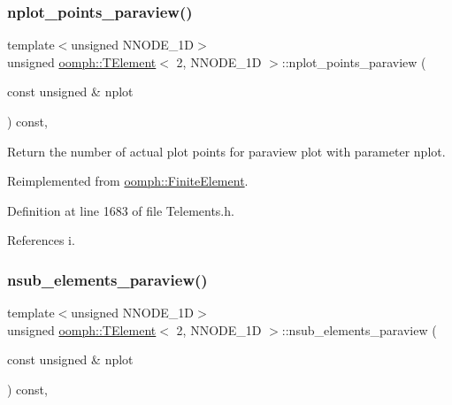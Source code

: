 \subsubsection{\texorpdfstring{nplot\+\_\+points\+\_\+paraview()}{nplot\_points\_paraview()}}
{\footnotesize\ttfamily template$<$unsigned N\+N\+O\+D\+E\+\_\+1D$>$ \\
unsigned \hyperlink{classoomph_1_1TElement}{oomph\+::\+T\+Element}$<$ 2, N\+N\+O\+D\+E\+\_\+1D $>$\+::nplot\+\_\+points\+\_\+paraview (\begin{DoxyParamCaption}\item[{const unsigned \&}]{nplot }\end{DoxyParamCaption}) const\hspace{0.3cm}{\ttfamily [inline]}, {\ttfamily [virtual]}}



Return the number of actual plot points for paraview plot with parameter nplot. 



Reimplemented from \hyperlink{classoomph_1_1FiniteElement_a06d32c85753a1e302c3b345ea27f6c85}{oomph\+::\+Finite\+Element}.



Definition at line 1683 of file Telements.\+h.



References i.

\mbox{\label{classoomph_1_1TElement_3_012_00_01NNODE__1D_01_4_acbd9eea53952435fe3a1c7c1aef1312a}} 
\subsubsection{\texorpdfstring{nsub\+\_\+elements\+\_\+paraview()}{nsub\_elements\_paraview()}}
{\footnotesize\ttfamily template$<$unsigned N\+N\+O\+D\+E\+\_\+1D$>$ \\
unsigned \hyperlink{classoomph_1_1TElement}{oomph\+::\+T\+Element}$<$ 2, N\+N\+O\+D\+E\+\_\+1D $>$\+::nsub\+\_\+elements\+\_\+paraview (\begin{DoxyParamCaption}\item[{const unsigned \&}]{nplot }\end{DoxyParamCaption}) const\hspace{0.3cm}{\ttfamily [inline]}, {\ttfamily [virtual]}}



